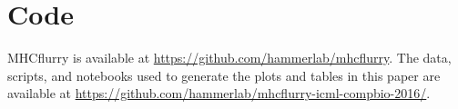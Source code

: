 \section{Code}
MHCflurry is available at \href{https://github.com/hammerlab/mhcflurry}{https://github.com/hammerlab/mhcflurry}. The data, scripts, and notebooks used to generate the plots and tables in this paper are available at \href{https://github.com/hammerlab/mhcflurry-icml-compbio-2016}{https://github.com/hammerlab/mhcflurry-icml-compbio-2016/}. 